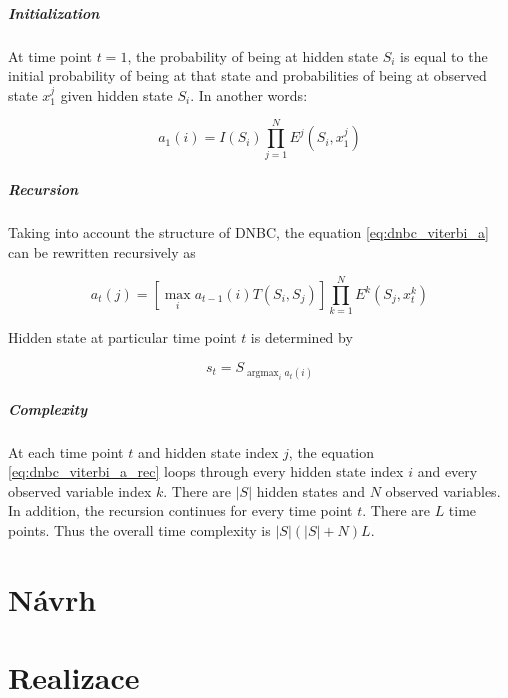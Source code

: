 \documentclass[thesis=B,english]{FITthesis}[2012/06/26]
\DeclareMathOperator*{\argmax}{argmax} %
\begin{document}
\paragraph{Initialization}

At time point $t=1$, the probability of being at hidden state $S_i$ is equal to the initial probability of being at that state and probabilities of being at observed state $x_1^j$ given hidden state $S_i$. In another words:

\begin{equation}
a_1(i) = I(S_i) \prod_{j=1}^N E^j(S_i,x^j_1)
\end{equation}

\paragraph{Recursion}
Taking into account the structure of DNBC, the equation \ref{eq:dnbc_viterbi_a} can be rewritten recursively as

\begin{equation} \label{eq:dnbc_viterbi_a_rec}
a_t(j) = [\max_i a_{t-1}(i)T(S_i,S_j)] \prod_{k=1}^N E^k(S_j,x^k_t)
\end{equation}

Hidden state at particular time point $t$ is determined by

\begin{equation}
s_t = S_{\argmax_i a_{t}(i)}
\end{equation}

\paragraph{Complexity}

At each time point $t$ and hidden state index $j$, the equation \ref{eq:dnbc_viterbi_a_rec} loops through every hidden state index $i$ and every observed variable index $k$. There are $\vert{S}\vert$ hidden states and $N$ observed variables. In addition, the recursion continues for every time point $t$. There are $L$ time points. Thus the overall time complexity is
${\vert{S}\vert}(\vert{S}\vert+N) L$.

\chapter{Návrh}

\chapter{Realizace}
\end{document}
